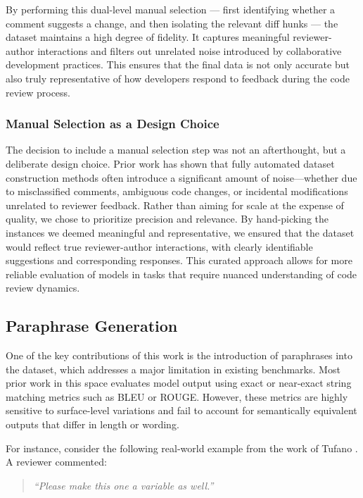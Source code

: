 By performing this dual-level manual selection — first identifying whether a comment suggests a
change, and then isolating the relevant diff hunks — the dataset maintains a high degree of
fidelity. It captures meaningful reviewer-author interactions and filters out unrelated noise
introduced by collaborative development practices. This ensures that the final data is not only
accurate but also truly representative of how developers respond to feedback during the code review
process.

\subsubsection{Manual Selection as a Design Choice}

The decision to include a manual selection step was not an afterthought, but a deliberate design
choice. Prior work has shown that fully automated dataset construction methods often introduce a
significant amount of noise—whether due to misclassified comments, ambiguous code changes, or
incidental modifications unrelated to reviewer feedback. Rather than aiming for scale at the expense
of quality, we chose to prioritize precision and relevance. By hand-picking the instances we deemed
meaningful and representative, we ensured that the dataset would reflect true reviewer-author
interactions, with clearly identifiable suggestions and corresponding responses. This curated
approach allows for more reliable evaluation of models in tasks that require nuanced understanding
of code review dynamics.

\subsection{Paraphrase Generation}
\label{sec:paraphrases}

One of the key contributions of this work is the introduction of paraphrases into the dataset, which
addresses a major limitation in existing benchmarks. Most prior work in this space evaluates model
output using exact or near-exact string matching metrics such as BLEU or ROUGE. However, these
metrics are highly sensitive to surface-level variations and fail to account for semantically
equivalent outputs that differ in length or wording.

For instance, consider the following real-world example from the work of Tufano \etal
\cite{tufano:icse2022}. A reviewer commented:

\begin{quote}
	\textit{“Please make this one a variable as well.”}
\end{quote}

